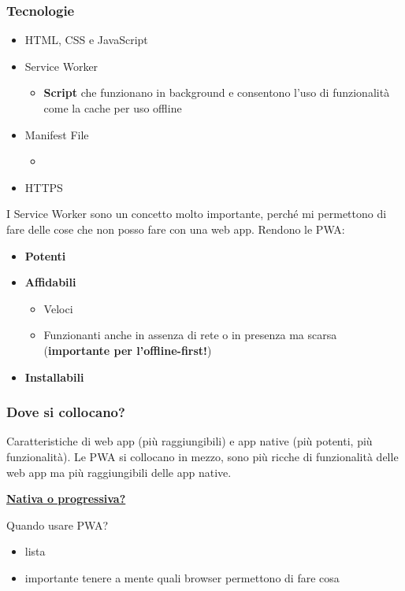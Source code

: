\subsubsection{Tecnologie}
\begin{itemize}
    \item HTML, CSS e JavaScript
    \item Service Worker
    \begin{itemize}
        \item \textbf{Script} che funzionano in background e consentono l'uso di funzionalità come la cache per uso offline
    \end{itemize}
    \item Manifest File
    \begin{itemize}
        \item 
    \end{itemize}
    \item HTTPS
\end{itemize}
\par I Service Worker sono un concetto molto importante, perché mi permettono di fare delle cose che non posso fare con una web app. Rendono le PWA:
\begin{itemize}
    \item \textbf{Potenti}
    \item \textbf{Affidabili}
    \begin{itemize}
        \item Veloci
        \item Funzionanti anche in assenza di rete o in presenza ma scarsa\\
        (\textbf{importante per l'offline-first!})
    \end{itemize}
    \item \textbf{Installabili}
\end{itemize}

\subsubsection{Dove si collocano?}
\par Caratteristiche di web app (più raggiungibili) e app native (più potenti, più funzionalità). Le PWA si collocano in mezzo, sono più ricche di funzionalità delle web app ma più raggiungibili delle app native.
\par \textbf{\underline{Nativa o progressiva?}}
\par Quando usare PWA?
\begin{itemize}
    \item lista
    \item importante tenere a mente quali browser permettono di fare cosa
\end{itemize}

